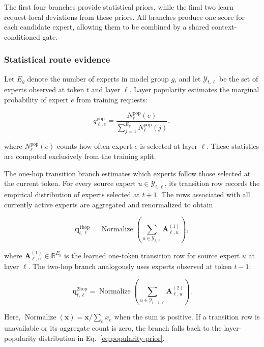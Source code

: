 \documentclass[conference]{IEEEtran}
\begin{document}
The first four branches provide statistical priors, while the final two learn
request-local deviations from these priors. All branches produce one score for
each candidate expert, allowing them to be combined by a shared
context-conditioned gate.

\subsubsection{Statistical route evidence}

Let \(E_g\) denote the number of experts in model group \(g\), and let
\(\mathcal{Y}_{t,\ell}\) be the set of experts observed at token \(t\) and
layer \(\ell\). Layer popularity estimates the marginal probability of expert
\(e\) from training requests:

\begin{equation}
q_{\ell,e}^{\mathrm{pop}}
=
\frac{
N_{\ell}^{\mathrm{pop}}(e)
}{
\displaystyle
\sum_{j=1}^{E_g}
N_{\ell}^{\mathrm{pop}}(j)
},
\label{eq:popularity-prior}
\end{equation}

where \(N_{\ell}^{\mathrm{pop}}(e)\) counts how often expert \(e\) is selected
at layer \(\ell\). These statistics are computed exclusively from the
training split.

The one-hop transition branch estimates which experts follow those selected
at the current token. For every source expert
\(u\in\mathcal{Y}_{t,\ell}\), its transition row records the empirical
distribution of experts selected at \(t+1\). The rows associated with all
currently active experts are aggregated and renormalized to obtain

\begin{equation}
\mathbf{q}_{t,\ell}^{\mathrm{1hop}}
=
\operatorname{Normalize}
\left(
\sum_{u\in\mathcal{Y}_{t,\ell}}
\mathbf{A}_{\ell,u}^{(1)}
\right),
\label{eq:one-hop-prior}
\end{equation}

where \(\mathbf{A}_{\ell,u}^{(1)}\in\mathbb{R}^{E_g}\) is the learned
one-token transition row for source expert \(u\) at layer \(\ell\).
The two-hop branch analogously uses experts observed at token \(t-1\):

\begin{equation}
\mathbf{q}_{t,\ell}^{\mathrm{2hop}}
=
\operatorname{Normalize}
\left(
\sum_{u\in\mathcal{Y}_{t-1,\ell}}
\mathbf{A}_{\ell,u}^{(2)}
\right).
\label{eq:two-hop-prior}
\end{equation}

Here, \(\operatorname{Normalize}(\mathbf{x})=\mathbf{x}/\sum_e x_e\) when
the sum is positive. If a transition row is unavailable or its aggregate count
is zero, the branch falls back to the layer-popularity distribution in
Eq.~\eqref{eq:popularity-prior}.
\end{document}
